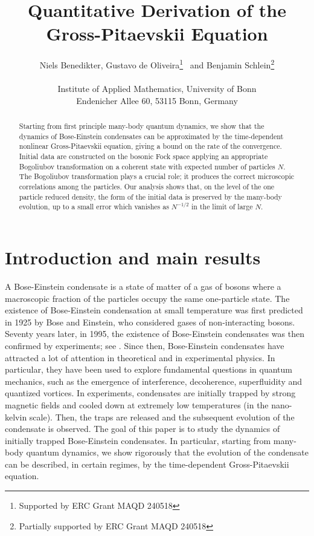 \documentclass[11pt,a4paper]{article}
\title{Quantitative Derivation of the Gross-Pitaevskii Equation}
\author{Niels Benedikter, Gustavo de Oliveira\thanks{Supported by ERC Grant MAQD 240518 }  \, and Benjamin Schlein\thanks{Partially supported by ERC Grant MAQD 240518} \\ \\ Institute of Applied Mathematics, University of Bonn\\ Endenicher Allee 60, 53115 Bonn, Germany}
\begin{document}
\maketitle

\begin{abstract}
Starting from first principle many-body quantum dynamics, we show that the dynamics of 
Bose-Einstein condensates can be approximated by the time-dependent nonlinear 
Gross-Pitaevskii equation, giving a bound on the rate of the convergence. Initial data are constructed on the bosonic Fock space applying an appropriate Bogoliubov transformation on a coherent state with expected number of particles $N$. The Bogoliubov transformation plays a crucial role; it produces the correct microscopic correlations among the particles. Our analysis shows that, on the level of the one particle reduced density, the form of the initial data is preserved by the many-body evolution, up to a small error which vanishes as $N^{-1/2}$ in the limit of large $N$.  
\end{abstract}

\section{Introduction and main results}
\label{s:intro}


A Bose-Einstein condensate is a state of matter of a gas of bosons where a macroscopic fraction of the particles occupy the same one-particle state. The existence of Bose-Einstein condensation at small temperature was first predicted in 1925 by Bose and Einstein, who considered gases of non-interacting bosons. Seventy years later, in 1995, the existence of Bose-Einstein condensates 
was then confirmed by experiments; see \cite{BEC1,BEC2}. Since then, Bose-Einstein condensates have attracted a lot of attention in theoretical and in experimental physics. In particular, they have been used to explore fundamental questions in quantum mechanics, such as the emergence of interference, decoherence, superfluidity and quantized vortices. In experiments, condensates are initially trapped by strong magnetic fields and cooled down at extremely low temperatures (in the nano-kelvin scale). Then, the traps are released and the subsequent evolution of the condensate is observed. The goal of this paper is to study the dynamics of initially trapped Bose-Einstein condensates. In particular, starting from many-body quantum dynamics, we 
show rigorously that the evolution of the condensate can be described, in certain regimes, by the time-dependent Gross-Pitaevskii equation. 
\end{document}
